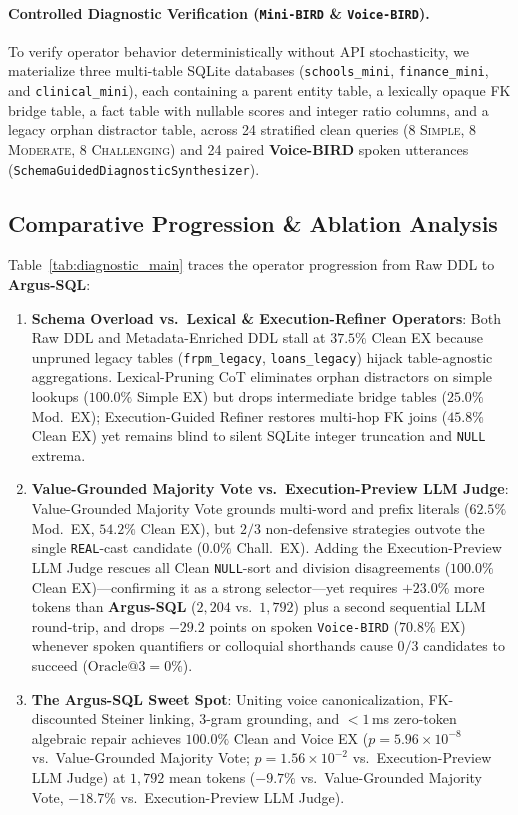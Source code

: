\documentclass[10pt,twocolumn]{article}
\begin{document}
\paragraph{Controlled Diagnostic Verification (\texttt{Mini-BIRD} \& \texttt{Voice-BIRD}).}
To verify operator behavior deterministically without API stochasticity, we materialize three multi-table SQLite databases (\texttt{schools\_\allowbreak mini}, \texttt{finance\_\allowbreak mini}, and \texttt{clinical\_\allowbreak mini}), each containing a parent entity table, a lexically opaque FK bridge table, a fact table with nullable scores and integer ratio columns, and a legacy orphan distractor table, across 24 stratified clean queries ($8$ \textsc{Simple}, $8$ \textsc{Moderate}, $8$ \textsc{Challenging}) and 24 paired \textbf{Voice-BIRD} spoken utterances (\texttt{SchemaGuided\allowbreak Diagnostic\allowbreak Synthesizer}).

\subsection{Comparative Progression \& Ablation Analysis}

Table~\ref{tab:diagnostic_main} traces the operator progression from Raw DDL to \textbf{Argus-SQL}:
\begin{enumerate}
  \item \textbf{Schema Overload vs.\ Lexical \& Execution-Refiner Operators}: Both Raw DDL and Metadata-Enriched DDL stall at $37.5\%$ Clean EX because unpruned legacy tables (\texttt{frpm\_\allowbreak legacy}, \texttt{loans\_\allowbreak legacy}) hijack table-agnostic aggregations. Lexical-Pruning CoT eliminates orphan distractors on simple lookups ($100.0\%$ Simple EX) but drops intermediate bridge tables ($25.0\%$ Mod.\ EX); Execution-Guided Refiner restores multi-hop FK joins ($45.8\%$ Clean EX) yet remains blind to silent SQLite integer truncation and \texttt{NULL} extrema.
  \item \textbf{Value-Grounded Majority Vote vs.\ Execution-Preview LLM Judge}: Value-Grounded Majority Vote grounds multi-word and prefix literals ($62.5\%$ Mod.\ EX, $54.2\%$ Clean EX), but $2/3$ non-defensive strategies outvote the single \texttt{REAL}-cast candidate ($0.0\%$ Chall.\ EX). Adding the Execution-Preview LLM Judge rescues all Clean \texttt{NULL}-sort and division disagreements ($100.0\%$ Clean EX)—confirming it as a strong selector—yet requires $+23.0\%$ more tokens than \textbf{Argus-SQL} ($2{,}204$ vs.\ $1{,}792$) plus a second sequential LLM round-trip, and drops $-29.2$ points on spoken \texttt{Voice-BIRD} ($70.8\%$ EX) whenever spoken quantifiers or colloquial shorthands cause $0/3$ candidates to succeed ($\text{Oracle}@3 = 0\%$).
  \item \textbf{The Argus-SQL Sweet Spot}: Uniting voice canonicalization, FK-discounted Steiner linking, 3-gram grounding, and $<1$\,ms zero-token algebraic repair achieves $100.0\%$ Clean and Voice EX ($p = 5.96 \times 10^{-8}$ vs.\ Value-Grounded Majority Vote; $p = 1.56 \times 10^{-2}$ vs.\ Execution-Preview LLM Judge) at $1{,}792$ mean tokens ($-9.7\%$ vs.\ Value-Grounded Majority Vote, $-18.7\%$ vs.\ Execution-Preview LLM Judge).
\end{enumerate}
\end{document}
